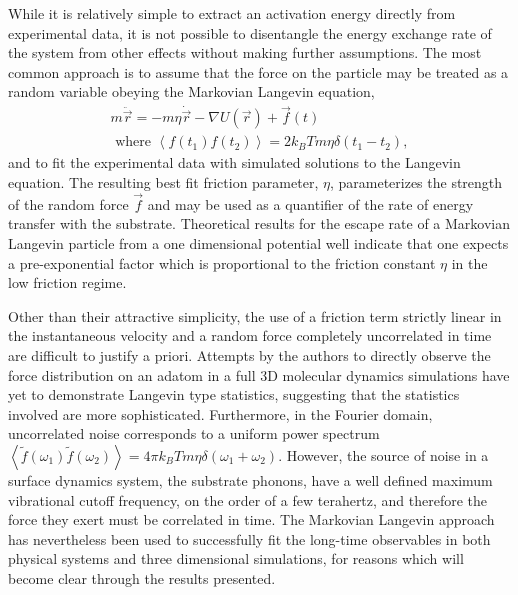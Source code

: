 \documentclass[7pt]{article}
\begin{document}
While it is relatively simple to extract an activation energy directly from experimental data\cite{Diamant,Alexandrowicz2006}, it is not possible to disentangle the energy exchange rate of the system from other effects without making further assumptions. The most common approach is to assume that the force on the particle may be treated as a random variable obeying the Markovian Langevin equation,
\begin{equation}
\begin{gathered}
	m\ddot{\vec{r}}=-m\eta\dot{\vec{r}}-\nabla U(\vec{r})+\vec{f}(t) \\ 
	\text{ where } \left<f(t_1)f(t_2)\right>=2k_BTm\eta\delta(t_1-t_2),
\end{gathered}
	\label{eq:langevin}
\end{equation}
and to fit the experimental data with simulated solutions to the Langevin equation. The resulting best fit friction parameter, $\eta$, parameterizes the strength of the random force $\vec{f}$ and may be used as a quantifier of the rate of energy transfer with the substrate. Theoretical results for the escape rate of a Markovian Langevin particle from a one dimensional potential well indicate that one expects a pre-exponential factor which is proportional to the friction constant $\eta$ in the low friction regime\cite{Kramers, Zwanzig}. 

Other than their attractive simplicity, the use of a friction term strictly linear in the instantaneous velocity and a random force completely uncorrelated in time are difficult to justify a priori. Attempts by the authors to directly observe the force distribution on an adatom in a full 3D molecular dynamics simulations have yet to demonstrate Langevin type statistics, suggesting that the statistics involved are more sophisticated. Furthermore, in the Fourier domain, uncorrelated noise corresponds to a uniform power spectrum $\left<\tilde{f}(\omega_1)\tilde{f}(\omega_2)\right>=4\pi k_BTm\eta\delta(\omega_1+\omega_2)$. However, the source of noise in a surface dynamics system, the substrate phonons, have a well defined maximum vibrational cutoff frequency, on the order of a few terahertz, and therefore the force they exert must be correlated in time\cite{Sinha}. The Markovian Langevin approach has nevertheless been used to successfully fit the long-time observables in both physical systems\cite{} and three dimensional simulations\cite{Diamant}, for reasons which will become clear through the results presented. 
\end{document}
